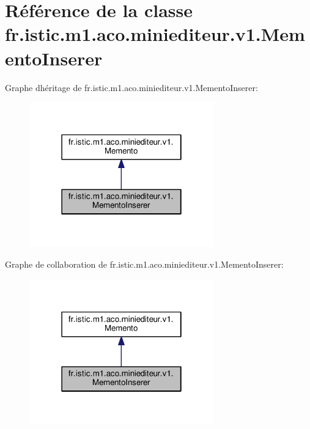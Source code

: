 \hypertarget{classfr_1_1istic_1_1m1_1_1aco_1_1miniediteur_1_1v1_1_1MementoInserer}{}\section{Référence de la classe fr.\+istic.\+m1.\+aco.\+miniediteur.\+v1.\+Memento\+Inserer}
\label{classfr_1_1istic_1_1m1_1_1aco_1_1miniediteur_1_1v1_1_1MementoInserer}


Graphe d\textquotesingle{}héritage de fr.\+istic.\+m1.\+aco.\+miniediteur.\+v1.\+Memento\+Inserer\+:\nopagebreak
\begin{figure}[H]
\begin{center}
\leavevmode
\includegraphics[width=226pt]{classfr_1_1istic_1_1m1_1_1aco_1_1miniediteur_1_1v1_1_1MementoInserer__inherit__graph}
\end{center}
\end{figure}


Graphe de collaboration de fr.\+istic.\+m1.\+aco.\+miniediteur.\+v1.\+Memento\+Inserer\+:\nopagebreak
\begin{figure}[H]
\begin{center}
\leavevmode
\includegraphics[width=226pt]{classfr_1_1istic_1_1m1_1_1aco_1_1miniediteur_1_1v1_1_1MementoInserer__coll__graph}
\end{center}
\end{figure}
